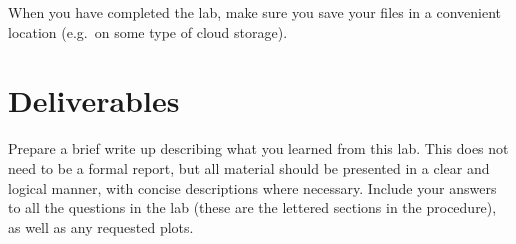 \begin{enumerate}
\end{enumerate}

When you have completed the lab, make sure you save your files in a convenient location (e.g.\ on some type of cloud storage).

\section{Deliverables}
Prepare a brief write up describing what you learned from this lab. This does not need to be a formal report, but all material should be presented in a clear and logical manner, with concise descriptions where necessary. Include your answers to all the questions in the lab (these are the lettered sections in the procedure), as well as any requested plots.